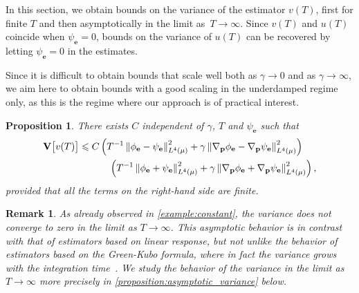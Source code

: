 \documentclass[11pt,a4paper]{article}
\newcommand{\var}[0]{\mathbf{V}}
\newcommand{\grad}{\nabla}
\newcommand{\vect}[1]{\boldsymbol{\mathbf #1}}
\theoremstyle{plain}
\newtheorem{proposition}[theorem]{Proposition}
\newtheorem{remark}{Remark}[section]
\numberwithin{equation}{section}
\renewcommand{\leq}{\leqslant}
\begin{document}
In this section, we obtain bounds on the variance of the estimator $v(T)$,
first for finite $T$ and then asymptotically in the limit as~$T \to \infty$.
Since $v(T)$ and $u(T)$ coincide when $\psi_{\vect e} = 0$,
bounds on the variance of $u(T)$ can be recovered by letting $\psi_{\vect e} = 0$ in the estimates.


Since it is difficult to obtain bounds that scale well both as $\gamma \to 0$ and as $\gamma \to \infty$,
we aim here to obtain bounds with a good scaling in the underdamped regime only,
as this is the regime where our approach is of practical interest.

\begin{proposition}
    There exists $C$ independent of $\gamma$, $T$ and $\psi_{\vect e}$ such that
    \begin{equation}
        \label{eq:statement_variance}
        \begin{aligned}[b]
            \var \bigl[v(T)\bigr]
            \leq
            C &\left( T^{-1} \norm{\phi_{\vect e} - \psi_{\vect e}}[L^4(\mu)]^2  + \gamma \norm{\grad_{\vect p} \phi_{\vect e} - \grad_{\vect p} \psi_{\vect e}}[L^4(\mu)]^2 \right) \\
              &\quad \left( T^{-1} \norm{\phi_{\vect e} + \psi_{\vect e}}[L^4(\mu)]^2  + \gamma \norm{\grad_{\vect p} \phi_{\vect e} + \grad_{\vect p} \psi_{\vect e}}[L^4(\mu)]^2 \right),
        \end{aligned}
    \end{equation}
    provided that all the terms on the right-hand side are finite.
\end{proposition}
\begin{remark}
    As already observed in \cref{example:constant},
    the variance does not converge to zero in the limit as $T \to \infty$.
    This asymptotic behavior is in contrast with that of estimators based on linear response,
    but not unlike the behavior of estimators based on the Green-Kubo formula,
    where in fact the variance grows with the integration time~\cite{LMS16}.
    We study the behavior of the variance in the limit as $T \to \infty$ more precisely in \cref{proposition:asymptotic_variance} below.
\end{remark}
\end{document}
